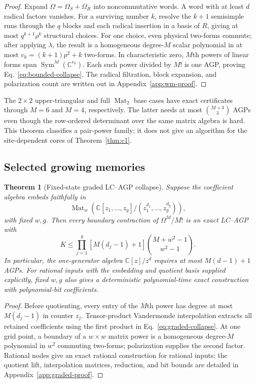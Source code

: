 \documentclass[11pt]{article}
\newtheorem{theorem}{Theorem}[section]
\theoremstyle{definition}
\newcommand{\Mat}{\operatorname{Mat}}
\begin{document}
\begin{proof}
Expand $\Omega=\Omega_S+\Omega_R$ into noncommutative words.  A word with at
least $d$ radical factors vanishes.  For a surviving number $k$, resolve the
$k+1$ semisimple runs through the $q$ blocks and each radical insertion in a
basis of $R$, giving at most $q^{k+1}\rho^k$ structural choices.  For one
choice, even physical two-forms commute; after applying $\lambda$, the result
is a homogeneous degree-$M$ scalar polynomial in at most
$v_k=(k+1)p^2+k$ two-forms.  In characteristic zero, $M$th powers of linear
forms span $\operatorname{Sym}^M(\mathbb C^{v_k})$.  Each such power divided by
$M!$ is one AGP, proving Eq.~\eqref{eq:bounded-collapse}.  The radical
filtration, block expansion, and polarization count are written out in
Appendix~\ref{app:wm-proof}.
\end{proof}

The $2\times2$ upper-triangular and full $\Mat_2$ base cases have exact
certificates through $M=6$ and $M=4$, respectively.  The latter needs at most
$\binom{M+3}{3}$ AGPs even though the row-ordered determinant over the same
matrix algebra is hard.  This theorem classifies a pair-power family; it does
not give an algorithm for the site-dependent cores of Theorem~\ref{thm:c1}.

\subsection{Selected growing memories}

\begin{theorem}[Fixed-state graded LC--AGP collapse]
Suppose the coefficient algebra embeds faithfully in
\[
 \Mat_w\!\left(\mathbb C[z_1,\ldots,z_g]/
 (z_1^{d_1},\ldots,z_g^{d_g})\right),
\]
with fixed $w,g$.  Then every boundary contraction of $\Omega^M/M!$ is an
exact LC--AGP with
\[
 K\le\prod_{j=1}^g[M(d_j-1)+1]
 \binom{M+w^2-1}{w^2-1}.
 \label{eq:graded-collapse}
\]
In particular, the one-generator algebra $\mathbb C[z]/z^d$ requires at most
$M(d-1)+1$ AGPs.  For rational inputs with the embedding and quotient basis
supplied explicitly, fixed $w,g$ also gives a deterministic polynomial-time
exact construction with polynomial-bit coefficients.
\end{theorem}

\begin{proof}
Before quotienting, every entry of the $M$th power has degree at most
$M(d_j-1)$ in counter $z_j$.  Tensor-product Vandermonde interpolation
extracts all retained coefficients using the first product in
Eq.~\eqref{eq:graded-collapse}.  At one grid point, a boundary of a $w\times w$
matrix power is a homogeneous degree-$M$ polynomial in $w^2$ commuting
two-forms; polarization supplies the second factor.  Rational nodes give an
exact rational construction for rational inputs; the quotient lift,
interpolation matrices, reduction, and bit bounds are detailed in
Appendix~\ref{app:graded-proof}.
\end{proof}
\end{document}
